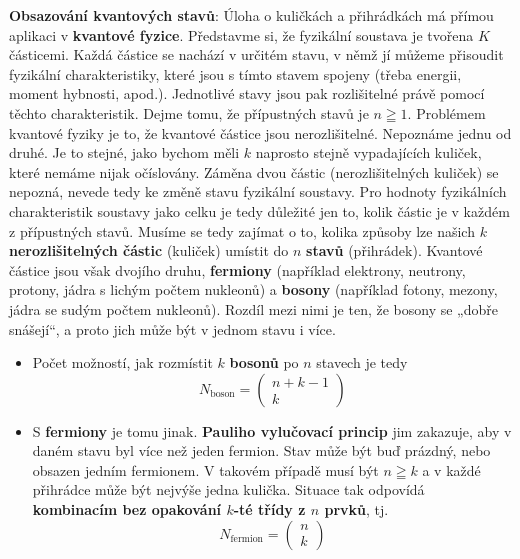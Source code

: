 \begin{example}\label{mai:exam010}
  \textbf{Obsazování kvantových stavů}:\newline
  Úloha o kuličkách a přihrádkách má přímou aplikaci v \textbf{kvantové fyzice}. Představme si, že 
  fyzikální soustava je tvořena \(K\) částicemi. Každá částice se nachází v určitém stavu, v němž 
  jí můžeme přisoudit fyzikální charakteristiky, které jsou s tímto stavem spojeny (třeba energii, 
  moment hybnosti, apod.). Jednotlivé stavy jsou pak rozlišitelné právě pomocí těchto 
  charakteristik. Dejme tomu, že přípustných stavů je \(n \geqq 1\). Problémem kvantové fyziky je 
  to, že kvantové částice jsou nerozlišitelné. Nepoznáme jednu od druhé. Je to stejné, jako bychom 
  měli \(k\) naprosto stejně vypadajících kuliček, které nemáme nijak očíslovány. Záměna dvou 
  částic (nerozlišitelných kuliček) se nepozná, nevede tedy ke změně stavu fyzikální soustavy. Pro 
  hodnoty fyzikálních charakteristik soustavy jako celku je tedy důležité jen to, kolik částic je v 
  každém z přípustných stavů. Musíme se tedy zajímat o to, kolika způsoby lze našich \(k\) 
  \textbf{nerozlišitelných částic} (kuliček) umístit do \(n\) \textbf{stavů} (přihrádek). Kvantové 
  částice jsou však dvojího druhu, \textbf{fermiony} (například elektrony, neutrony, protony, jádra 
  s lichým počtem nukleonů) a \textbf{bosony} (například fotony, mezony, jádra se sudým počtem 
  nukleonů). Rozdíl mezi nimi je ten, že bosony se „dobře snášejí“, a proto jich může být v jednom 
  stavu i více. 
  \begin{itemize}\addtolength{\itemsep}{-0.5\baselineskip}
    \item Počet možností, jak rozmístit \(k\) \textbf{bosonů} po \(n\) stavech je tedy
          \begin{equation*}
            N_{\text{boson}} = 
              \begin{pmatrix}
                n + k - 1 \\
                    k
               \end{pmatrix}
          \end{equation*}
    \item S \textbf{fermiony} je tomu jinak. \textbf{Pauliho vylučovací princip} jim zakazuje, 
          aby v daném stavu byl více než jeden fermion. Stav může být buď prázdný, nebo obsazen 
          jedním fermionem. V takovém případě musí být \(n \geqq k\) a v každé přihrádce může být 
          nejvýše jedna kulička. Situace tak odpovídá \textbf{kombinacím bez opakování \(k\)-té 
          třídy z \(n\) prvků}, tj.
          \begin{equation*}
            N_{\text{fermion}} = 
              \begin{pmatrix}
                n  \\
                k
              \end{pmatrix}
          \end{equation*}
  \end{itemize}  
\end{example}